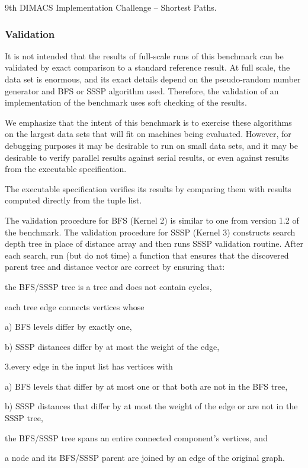 \documentclass{article}
\begin{document}
9th DIMACS Implementation Challenge -- Shortest Paths.

\subsubsection*{Validation}

It is not intended that the results of full-scale runs of this benchmark can be validated by exact comparison to a standard reference result. At full scale, the data set is enormous, and its exact details depend on the pseudo-random number generator and BFS or SSSP algorithm used. Therefore, the validation of an implementation of the benchmark uses soft checking of the results.

We emphasize that the intent of this benchmark is to exercise these algorithms on the largest data sets that will fit on machines being evaluated. However, for debugging purposes it may be desirable to run on small data sets, and it may be desirable to verify parallel results against serial results, or even against results from the executable specification.

The executable specification verifies its results by comparing them with results computed directly from the tuple list.

The validation procedure for BFS (Kernel 2) is similar to one from version 1.2 of the benchmark. The validation procedure for SSSP (Kernel 3) constructs search depth tree in place of distance array and then runs SSSP validation routine. After each search, run (but do not time) a function that ensures that the discovered parent tree and distance vector are correct by ensuring that:

the BFS/SSSP tree is a tree and does not contain cycles,

each tree edge connects vertices whose

a) BFS levels differ by exactly one,

b) SSSP distances differ by at most the weight of the edge,

3.every edge in the input list has vertices with

a) BFS levels that differ by at most one or that both are not in the BFS tree,

b) SSSP distances that differ by at most the weight of the edge or are not in the SSSP tree,

the BFS/SSSP tree spans an entire connected component's vertices, and

a node and its BFS/SSSP parent are joined by an edge of the original graph.
\end{document}
